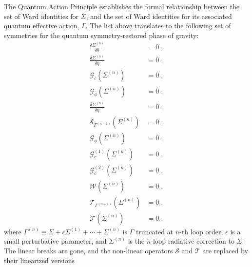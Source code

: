 \documentclass[../main.tex]{subfiles}
\begin{document}
The Quantum Action Principle establishes the formal relationship between the set of Ward identities for $ \Sigma $, and the set of Ward identities for its associated quantum effective action, $ \Gamma $. The list above translates to the following set of symmetries for the quantum symmetry-restored phase of gravity:
\begin{subequations}%
  \label{eq:ward-identities}
  \begin{align}
    \frac{ \delta \Sigma^{ \left( n \right) } }{ \delta b }            & = 0 \;,                                \\
    \frac{ \delta \Sigma^{ \left( n \right) } }{ \delta \bar{ \eta } } & = 0 \;,                                \\
    \mathcal{G}_{ \bar{ c } } \left( \Sigma ^{ (n) } \right)           & = 0 \;,                                \\
    \mathcal{G}_{ \bar{ \phi  } } \left( \Sigma ^{ (n) } \right)       & = 0 \;,                                \\
    \frac{ \delta \Sigma^{ \left( n \right) } }{ \delta \bar{ \eta } } & = 0 \;,                                \\
    \mathcal{S}_{\Gamma^{(n-1)}} \left( \Sigma^{ (n)} \right)          & = 0 \;, \label{eq:quantum-st-identity} \\
    \mathcal{G}_{ \phi } \left( \Sigma ^{ (n) } \right)                & = 0 \;,                                \\
    \mathcal{G}^{(1)}_{ c } \left( \Sigma ^{ (n) } \right)             & = 0 \;,                                \\
    \mathcal{G}^{(2)}_{ c } \left( \Sigma ^{ (n) } \right)             & = 0 \;,                                \\
    \mathcal{W} \left( \Sigma^{ (n)} \right)                           & = 0 \;,                                \\
    \mathcal{T}_{\Gamma^{(n-1)}} \left( \Sigma^{ (n)} \right)          & = 0 \;,                                \\
    \mathcal{F} \left( \Sigma^{ (n)} \right)                           & = 0 \;,
  \end{align}
\end{subequations}
where $\Gamma^{(n)} \equiv \Sigma + \epsilon \Sigma^{(1)} + \cdots + \Sigma^{ (n) }$ is $ \Gamma  $ truncated at $ n $-th loop order, $ \epsilon $ is a small perturbative parameter, and $ \Sigma^{ (n)} $ is the $n$-loop radiative correction to $ \Sigma  $. The linear breaks are gone, and the non-linear operators $ \mathcal{S} $ and $ \mathcal{T} $ are replaced by their linearized versions
\end{document}
